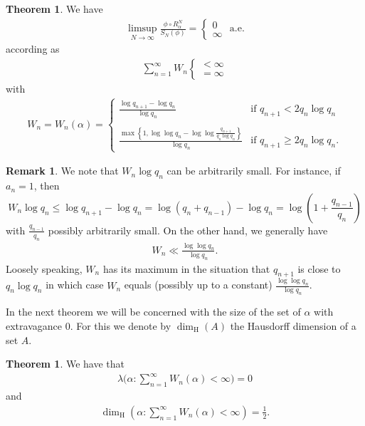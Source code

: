 \documentclass[11pt]{amsart}
\theoremstyle{definition}
\newtheorem{theorem}[definition]{Theorem}
\newtheorem{remark}[definition]{Remark}
\numberwithin{equation}{section}
\begin{document}
\begin{theorem}\label{thm: main rot}
We have
\begin{align*}
  \limsup_{N\to\infty}\frac{\phi\circ R_{\alpha}^N}{S_N(\phi)}=\begin{cases} 0\\ \infty
  \end{cases}\text{ a.e.}
 \end{align*}
 according as 
 \begin{align}
  \sum_{n=1}^{\infty}W_n\begin{cases}<\infty \\ =\infty
\end{cases}
\label{eq: sum 1logqn}
 \end{align}
 with 
\begin{align*}
 W_n=W_n(\alpha)=\begin{cases}
      \frac{\log q_{n+1}-\log q_n}{\log q_n}&\text{if }q_{n+1}< 2q_n\log q_n\\
      \\
      \tfrac{\max\left\{1, \log\log q_n-\log\log \frac{q_{n+1}}{q_n\log q_n } \right\}}{\log q_n }&\text{if } q_{n+1}\geq 2q_n\log q_n.
     \end{cases}
\end{align*}
\end{theorem}


\begin{remark}\label{rem: Wn}
 We note that $W_n\log q_n$ can be arbitrarily small. For instance, if $a_n=1$, then 
 $$W_n\log q_n\leq \log q_{n+1}-\log q_n=\log(q_n+q_{n-1})-\log q_n= \log \left(1+\frac{q_{n-1}}{q_n}\right)$$
 with $\frac{q_{n-1}}{q_n}$ possibly arbitrarily small. 
 On the other hand, we generally have 
 \begin{align}
  W_n\ll \frac{\log\log q_n}{\log q_n}.
 \end{align}
 Loosely speaking, $W_n$ has its maximum in the situation that $q_{n+1}$ is close to $q_n\log q_n$ in which case $W_n$ equals (possibly up to a constant) $\frac{\log\log q_n}{\log q_n}$. 
\end{remark}


 In the next theorem we will be concerned with the size of the set of $\alpha$ with extravagance $0$. For this we denote by $\dim_{\mathrm{H}}(A)$ the Hausdorff dimension of a set $A$.



\begin{theorem}\label{prop: measzeroset}
We have that
 \begin{align}
  \lambda\Big(\alpha: \sum_{n=1}^{\infty} W_n(\alpha)<\infty \Big)=0\label{eq: Wn finite small}
 \end{align}
and 
\begin{align}
 \dim_{\mathrm{H}}\left(\alpha: \sum_{n=1}^{\infty} W_n(\alpha)<\infty\right)= \frac{1}{2}.\label{prop: HD dimension} 
\end{align}
\end{theorem}
\end{document}
